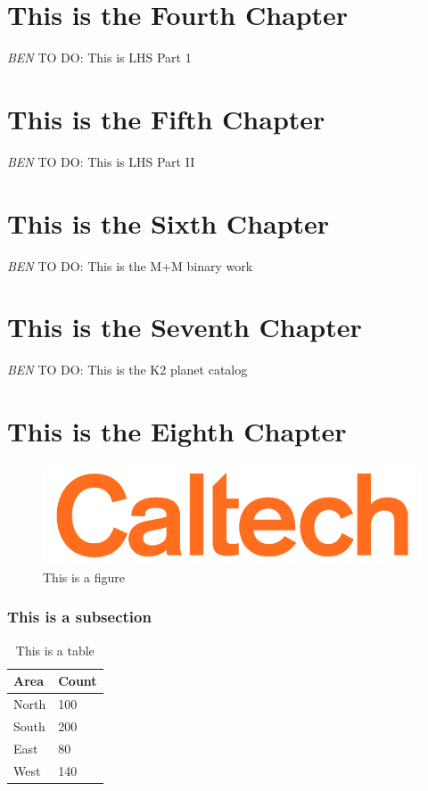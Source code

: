 \documentclass[12pt]{caltech_thesis}
\newcommand{\todo}[3]{{\color{#2} \emph{#1} TO DO: #3}}
\newcommand{\btmtodo}[1]{\todo{BEN}{red}{#1}}
\begin{document}


\chapter{This is the Fourth Chapter}
\label{chap:lhs1}

\btmtodo{This is LHS Part 1}
\chapter{This is the Fifth Chapter}

\btmtodo{This is LHS Part II}
\label{chap:lhsspitz}

\chapter{This is the Sixth Chapter}
\label{chap:Mbinaries}

\btmtodo{This is the M+M binary work}

\chapter{This is the Seventh Chapter}
\label{chap:k2}

\btmtodo{This is the K2 planet catalog}

\chapter{This is the Eighth Chapter}
\label{chap:wfirst}

\begin{figure}[hbt!]
\centering
\includegraphics[width=.3\textwidth]{caltech.png}
\caption[Example Figure]{This is a figure}
\label{fig:logo}
\end{figure}

\subsection{This is a subsection}

\begin{table}[hbt!]
\centering
\begin{tabular}{ll}
\hline
Area & Count\\
\hline
North & 100\\
South & 200\\
East & 80\\
West & 140\\
\hline
\end{tabular}
\caption[Table]{This is a table}
\label{tab:sample}
\end{table}
\end{document}
